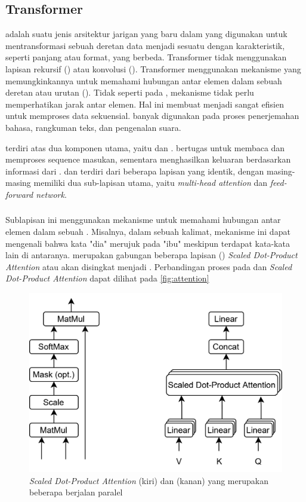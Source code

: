 \subsection{Transformer}
\label{subsec:transformer}

\transformer{} adalah suatu jenis arsitektur jarigan yang baru dalam \dl{} yang digunakan untuk mentransformasi sebuah deretan data menjadi sesuatu dengan karakteristik, seperti panjang atau format, yang berbeda. Transformer tidak menggunakan lapisan rekursif (\rnn) atau konvolusi (\cnn).  Transformer menggunakan mekanisme \selfattention{} yang memungkinkannya untuk memahami hubungan antar elemen dalam sebuah deretan atau urutan
(\sequence). Tidak seperti pada \rnn{}, mekanisme \selfattention tidak perlu memperhatikan jarak antar elemen. Hal ini membuat \transformer{} menjadi sangat efisien untuk memproses data sekuensial. \transformer{} banyak digunakan pada proses penerjemahan bahasa, rangkuman teks, dan pengenalan suara.

\transformer{} terdiri atas dua komponen utama, yaitu \encoder{} dan \decoder. \encoderfl{} bertugas untuk membaca dan memproses sequence masukan, sementara \decoder{} menghasilkan \sequence{} keluaran berdasarkan informasi dari \encoder. \encoderfl{} dan \decoder{} terdiri dari beberapa lapisan yang identik, dengan masing-masing memiliki dua sub-lapisan utama, yaitu \emph{multi-head attention} dan \emph{feed-forward network}.

\subsubsection{\mha}
Sublapisan ini menggunakan mekanisme \selfattention{} untuk memahami hubungan antar elemen dalam sebuah \sequence{}. Misalnya, dalam sebuah kalimat, mekanisme ini dapat mengenali bahwa kata "dia" merujuk pada "ibu" meskipun terdapat kata-kata lain di antaranya. \mha{} merupakan gabungan beberapa lapisan (\layer) \emph{Scaled Dot-Product Attention} atau akan disingkat menjadi \attention. Perbandingan proses pada \mha{} dan \emph{Scaled Dot-Product Attention} dapat dilihat pada \autoref{fig:attention}
	\begin{figure}[htbp]
		\centering
		\includegraphics[width=.8\textwidth]{images/attentionmha.png}
		\caption{\emph{Scaled Dot-Product Attention} (kiri) dan \mha{} (kanan) yang merupakan beberapa \layer{} \attention{} berjalan paralel \parencite{vaswani2017attention}}
		\label{fig:attention}
	\end{figure}

